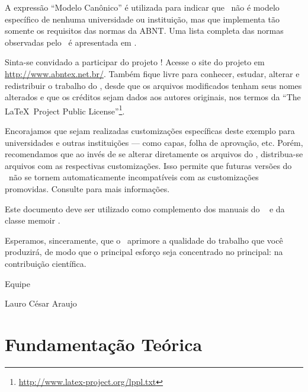 \documentclass[
	12pt,				%
	openright,			%
	twoside,			%
	a4paper,			%
	english,			%
	brazil				%
	]{abntex2}
\begin{document}
A expressão ``Modelo Canônico'' é utilizada para indicar que \abnTeX\ não é
modelo específico de nenhuma universidade ou instituição, mas que implementa tão
somente os requisitos das normas da ABNT. Uma lista completa das normas
observadas pelo \abnTeX\ é apresentada em \cite{abntex2classe}.

Sinta-se convidado a participar do projeto \abnTeX! Acesse o site do projeto em
\url{http://www.abntex.net.br/}. Também fique livre para conhecer,
estudar, alterar e redistribuir o trabalho do \abnTeX, desde que os arquivos
modificados tenham seus nomes alterados e que os créditos sejam dados aos
autores originais, nos termos da ``The \LaTeX\ Project Public
License''\footnote{\url{http://www.latex-project.org/lppl.txt}}.

Encorajamos que sejam realizadas customizações específicas deste exemplo para
universidades e outras instituições --- como capas, folha de aprovação, etc.
Porém, recomendamos que ao invés de se alterar diretamente os arquivos do
\abnTeX, distribua-se arquivos com as respectivas customizações.
Isso permite que futuras versões do \abnTeX~não se tornem automaticamente
incompatíveis com as customizações promovidas. Consulte
\cite{abntex2-wiki-como-customizar} para mais informações.

Este documento deve ser utilizado como complemento dos manuais do \abnTeX\ 
\cite{abntex2classe,abntex2cite,abntex2cite-alf} e da classe \textsf{memoir}
\cite{memoir}. 

Esperamos, sinceramente, que o \abnTeX\ aprimore a qualidade do trabalho que
você produzirá, de modo que o principal esforço seja concentrado no principal:
na contribuição científica.

Equipe \abnTeX 

Lauro César Araujo

\chapter{Fundamentação Teórica}\label{cap_exemplos}


\end{document}
